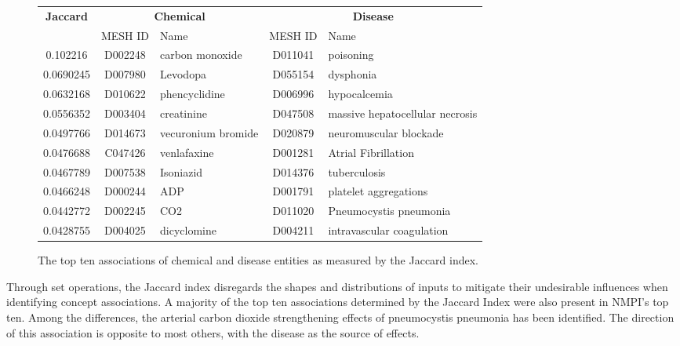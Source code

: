 \documentclass[10pt, oneside]{article}
\begin{document}
\begin{figure}[h]
\begin{center}
\fontsize{9}{11}\selectfont
\begin{tabular}{|*{2}{c|}p{4.5cm}|c|p{4.5cm}|}\hline
 \multirow{2}{*}{\textbf{Jaccard}} & \multicolumn{2}{c|}{\textbf{Chemical}} & \multicolumn{2}{c|}{\textbf{Disease}} \\ \cline{2-5}
 & MESH ID   & Name                      & MESH ID   & Name                         \\ \hline
       0.102216  & D002248   & carbon monoxide    & D011041   & poisoning                       \\ \hline
       0.0690245 & D007980   & Levodopa           & D055154   & dysphonia                       \\ \hline
       0.0632168 & D010622   & phencyclidine      & D006996   & hypocalcemia                    \\ \hline
       0.0556352 & D003404   & creatinine         & D047508   & massive hepatocellular necrosis \\ \hline
       0.0497766 & D014673   & vecuronium bromide & D020879   & neuromuscular blockade          \\ \hline
       0.0476688 & C047426   & venlafaxine        & D001281   & Atrial Fibrillation             \\ \hline
       0.0467789 & D007538   & Isoniazid          & D014376   & tuberculosis                    \\ \hline
       0.0466248 & D000244   & ADP                & D001791   & platelet aggregations           \\ \hline
       0.0442772 & D002245   & CO2                & D011020   & Pneumocystis pneumonia          \\ \hline
       0.0428755 & D004025   & dicyclomine        & D004211   & intravascular coagulation       \\ \hline
\end{tabular}
\caption{\label{fig:jaccard} The top ten associations of chemical and disease entities as measured by the Jaccard index.}
\end{center}
\end{figure}

Through set operations, the Jaccard index disregards the shapes and distributions of inputs \cite{leydesdorff2008normalization} to mitigate their undesirable influences when identifying concept associations. A majority of the top ten associations determined by the Jaccard Index were also present in NMPI's top ten. Among the differences, the arterial carbon dioxide strengthening effects of pneumocystis pneumonia \cite{bouma2009normalized} has been identified. The direction of this association is opposite to most others, with the disease as the source of effects.
\end{document}
